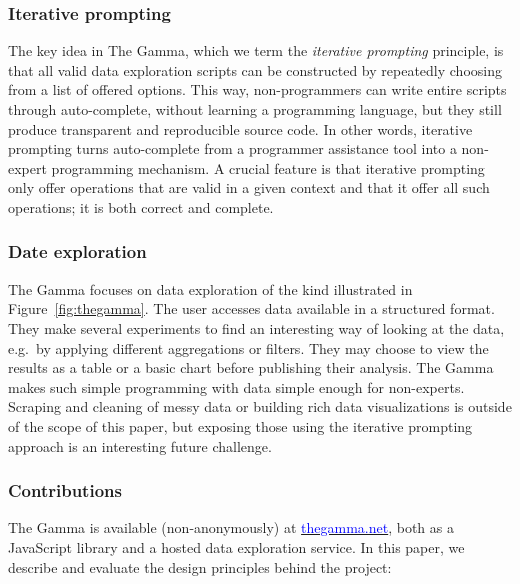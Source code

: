 \documentclass[manuscript,review,anonymous]{acmart}
\begin{document}
\subsubsection*{Iterative prompting}
The key idea in The Gamma, which we term the \emph{iterative prompting} principle, is that all
valid data exploration scripts can be constructed by repeatedly choosing from a list
of offered options. This way, non-programmers can write entire scripts through auto-complete,
without learning a programming language, but they still produce transparent and reproducible
source code. In other words, iterative prompting turns auto-complete from a programmer assistance
tool into a non-expert programming mechanism. A crucial feature is that iterative prompting
only offer operations that are valid in a given context and that it offer all such operations;
it is both correct and complete.

\subsubsection*{Date exploration}
The Gamma focuses on data exploration of the kind illustrated in Figure~\ref{fig:thegamma}.
The user accesses data available in a structured format. They make several experiments to find an
interesting way of looking at the data, e.g.~by applying different aggregations or filters. They
may choose to view the results as a table or a basic chart before publishing their analysis. The
Gamma makes such simple programming with data simple enough for non-experts. Scraping and cleaning
of messy data or building rich data visualizations is outside of the scope of this paper, but
exposing those using the iterative prompting approach is an interesting future challenge.

\subsubsection*{Contributions}
The Gamma is available (non-anonymously) at \href{http://thegamma.net}{\textcolor{blue}{thegamma.net}},
both as a JavaScript library and a hosted data exploration service. In this paper, we describe and
evaluate the design principles behind the project:
\end{document}
